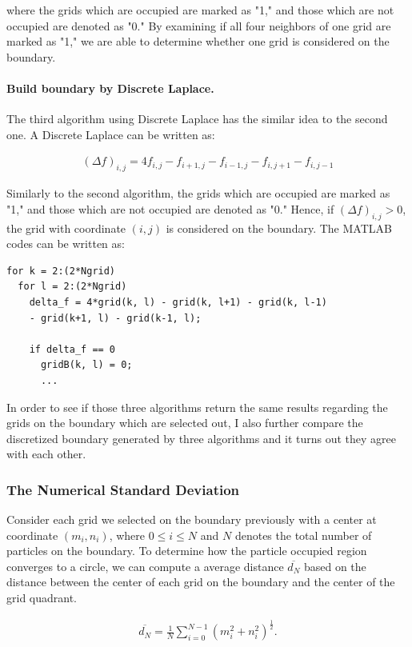 \documentclass[letterpaper]{article}
\numberwithin{equation}{section} %
\numberwithin{figure}{section} %
\numberwithin{table}{section} %
\begin{document}
\noindent
where the grids which are occupied are marked as "1," and those which are not occupied are denoted as "0." By examining if all four neighbors of one grid are marked as "1," we are able to determine whether one grid is considered on the boundary.


\paragraph{Build boundary by Discrete Laplace.}
The third algorithm using Discrete Laplace has the similar idea to the second one. A Discrete Laplace can be written as:

\begin{align} 
(\Delta f)_{i,j} = 4f_{i,j}-f_{i+1,j}- f_{i-1,j}-f_{i,j+1}-f_{i,j-1}
\end{align}

\noindent
Similarly to the second algorithm, the grids which are occupied are marked as "1," and those which are not occupied are denoted as "0." Hence, if $(\Delta f)_{i,j}>0$, the grid with coordinate $(i,j)$ is considered on the boundary. The MATLAB codes can be written as:

\begin{lstlisting}
for k = 2:(2*Ngrid)
  for l = 2:(2*Ngrid)
    delta_f = 4*grid(k, l) - grid(k, l+1) - grid(k, l-1) 
    - grid(k+1, l) - grid(k-1, l);

    if delta_f == 0  
      gridB(k, l) = 0; 
      ...
\end{lstlisting}

In order to see if those three algorithms return the same results regarding the grids on the boundary which are selected out, I also further compare the discretized boundary generated by three algorithms and it turns out they agree with each other.




\subsubsection{The Numerical Standard Deviation}
Consider each grid we selected on the boundary previously with a center at coordinate $(m_i,n_i)$, where $0\leq i\leq N$ and $N$ denotes the total number of particles on the boundary. To determine how the particle occupied region converges to a circle, we can compute a average distance $\overline{d_N}$ based on the distance between the center of each grid on the boundary and the center of the grid quadrant. 

\begin{align} 
\overline{d_N} = \frac{1}{N} \sum_{i=0}^{N-1} (m_i^2+n_i^2)^{\frac{1}{2}}.
\end{align}
 
\end{document}
